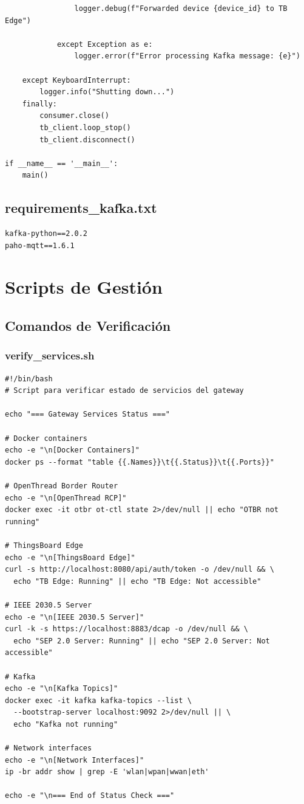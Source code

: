 \begin{verbatim}
                logger.debug(f"Forwarded device {device_id} to TB Edge")
            
            except Exception as e:
                logger.error(f"Error processing Kafka message: {e}")
    
    except KeyboardInterrupt:
        logger.info("Shutting down...")
    finally:
        consumer.close()
        tb_client.loop_stop()
        tb_client.disconnect()

if __name__ == '__main__':
    main()
\end{verbatim}

\subsection{requirements\_kafka.txt}

\begin{verbatim}
kafka-python==2.0.2
paho-mqtt==1.6.1
\end{verbatim}

\section{Scripts de Gestión}

\subsection{Comandos de Verificación}

\subsubsection{verify\_services.sh}

\begin{verbatim}
#!/bin/bash
# Script para verificar estado de servicios del gateway

echo "=== Gateway Services Status ==="

# Docker containers
echo -e "\n[Docker Containers]"
docker ps --format "table {{.Names}}\t{{.Status}}\t{{.Ports}}"

# OpenThread Border Router
echo -e "\n[OpenThread RCP]"
docker exec -it otbr ot-ctl state 2>/dev/null || echo "OTBR not running"

# ThingsBoard Edge
echo -e "\n[ThingsBoard Edge]"
curl -s http://localhost:8080/api/auth/token -o /dev/null && \
  echo "TB Edge: Running" || echo "TB Edge: Not accessible"

# IEEE 2030.5 Server
echo -e "\n[IEEE 2030.5 Server]"
curl -k -s https://localhost:8883/dcap -o /dev/null && \
  echo "SEP 2.0 Server: Running" || echo "SEP 2.0 Server: Not accessible"

# Kafka
echo -e "\n[Kafka Topics]"
docker exec -it kafka kafka-topics --list \
  --bootstrap-server localhost:9092 2>/dev/null || \
  echo "Kafka not running"

# Network interfaces
echo -e "\n[Network Interfaces]"
ip -br addr show | grep -E 'wlan|wpan|wwan|eth'

echo -e "\n=== End of Status Check ==="
\end{verbatim}

